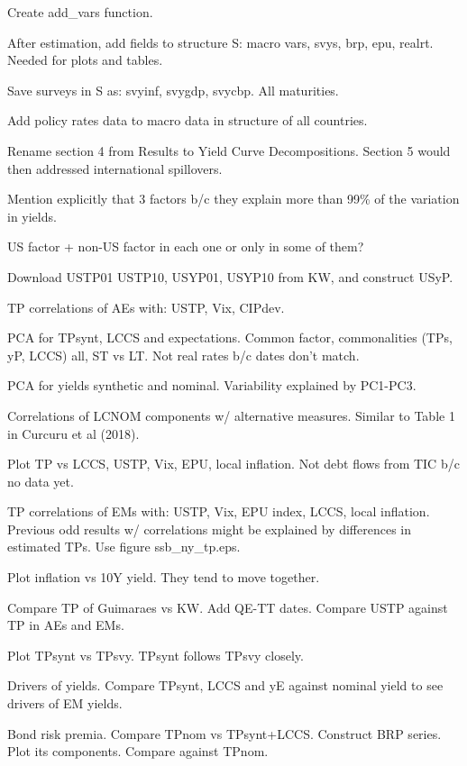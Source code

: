 \documentclass[12pt]{article}
\newcommand{\cmark}{\ding{51}}
\newcommand{\done}{\rlap{$\square$}{\raisebox{2pt}{\large\hspace{1pt}\cmark}}%
	\hspace{-2.5pt}}
\begin{document}
\begin{todolist}
\begin{todolist}
		\item[\done] Create add_vars function.
		\item[\done] After estimation, add fields to structure S: macro vars, svys, brp, epu, realrt. Needed for plots and tables.
		\item[\done] Save surveys in S as: svyinf, svygdp, svycbp. All maturities. 
		\item[\done] Add policy rates data to macro data in structure of all countries.
	\end{todolist}
	\item[\done] Rename section 4 from Results to Yield Curve Decompositions. Section 5 would then addressed international spillovers.
	\item[\done] Mention explicitly that 3 factors b/c they explain more than 99\% of the variation in yields.
	\item[\done] US factor + non-US factor in each one or only in some of them?
	\item[\done] Download USTP01 USTP10, USYP01, USYP10 from KW, and construct USyP.
	\item[\done] TP correlations of AEs with: USTP, Vix, CIPdev.
	\item[\done] PCA for TPsynt, LCCS and expectations. Common factor, commonalities (TPs, yP, LCCS) all, ST vs LT. Not real rates b/c dates don't match.
	\item[\done] PCA for yields synthetic and nominal. Variability explained by PC1-PC3. 
	\item[\done] Correlations of LCNOM components w/ alternative measures. Similar to Table 1 in Curcuru et al (2018).
	\item[\done] Plot TP vs LCCS, USTP, Vix, EPU, local inflation. Not debt flows from TIC b/c no data yet.
	\item[\done] TP correlations of EMs with: USTP, Vix, EPU index, LCCS, local inflation. Previous odd results w/ correlations might be explained by differences in estimated TPs. Use figure ssb_ny_tp.eps.
	\item[\done] Plot inflation vs 10Y yield. They tend to move together.
	\item[\done] Compare TP of Guimaraes vs KW. Add QE-TT dates. Compare USTP against TP in AEs and EMs.
	\item[\done] Plot TPsynt vs TPsvy. TPsynt follows TPsvy closely.
	\item[\done] Drivers of yields. Compare TPsynt, LCCS and yE against nominal yield to see drivers of EM yields.
	\item[\done] Bond risk premia. Compare TPnom vs TPsynt+LCCS. Construct BRP series. Plot its components. Compare against TPnom.

\end{todolist}
\end{document}
